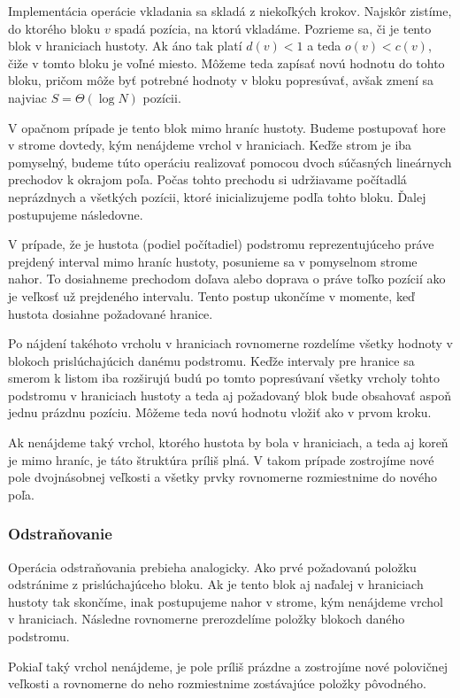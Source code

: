 Implementácia operácie vkladania sa skladá z niekoľkých krokov. Najskôr zistíme, do ktorého bloku $v$ spadá pozícia, na ktorú vkladáme. Pozrieme sa, či je tento blok v hraniciach hustoty. Ak áno tak platí $d(v) < 1$ a teda $o(v) < c(v)$, čiže v tomto bloku je voľné miesto. Môžeme teda zapísať novú hodnotu do tohto bloku, pričom môže byť potrebné hodnoty v bloku popresúvať, avšak zmení sa najviac $S = \Theta(\log{N})$ pozícii.

V opačnom prípade je tento blok mimo hraníc hustoty. Budeme postupovať hore v strome dovtedy, kým nenájdeme vrchol v hraniciach. Keďže strom je iba pomyselný, budeme túto operáciu realizovať pomocou dvoch súčasných lineárnych prechodov k okrajom poľa. Počas tohto prechodu si udržiavame počítadlá neprázdnych a všetkých pozícii, ktoré inicializujeme podľa tohto bloku. Ďalej postupujeme následovne.

V prípade, že je hustota (podiel počítadiel) podstromu reprezentujúceho práve prejdený interval  mimo hraníc hustoty, posunieme sa v pomyselnom strome nahor. To dosiahneme prechodom doľava alebo doprava o práve toľko pozícií ako je veľkosť už prejdeného intervalu. Tento postup ukončíme v momente, keď hustota dosiahne požadované hranice.

Po nájdení takéhoto vrcholu v hraniciach rovnomerne rozdelíme všetky hodnoty v blokoch prislúchajúcich danému podstromu. Keďže intervaly pre hranice sa smerom k listom iba rozširujú budú po tomto popresúvaní všetky vrcholy tohto podstromu v hraniciach hustoty a teda aj požadovaný blok bude obsahovať aspoň jednu prázdnu pozíciu. Môžeme teda novú hodnotu vložiť ako v prvom kroku.

Ak nenájdeme taký vrchol, ktorého hustota by bola v hraniciach, a teda aj koreň je mimo hraníc, je táto štruktúra príliš plná. V takom prípade zostrojíme nové pole dvojnásobnej veľkosti a všetky prvky rovnomerne rozmiestnime do nového poľa.

\subsubsection{Odstraňovanie}

Operácia odstraňovania prebieha analogicky. Ako prvé požadovanú položku odstránime z prislúchajúceho bloku. Ak je tento blok aj naďalej v hraniciach hustoty tak skončíme, inak postupujeme nahor v strome, kým nenájdeme vrchol v hraniciach. Následne rovnomerne prerozdelíme položky blokoch daného podstromu.

Pokiaľ taký vrchol nenájdeme, je pole príliš prázdne a zostrojíme nové polovičnej veľkosti a rovnomerne do neho rozmiestnime zostávajúce položky pôvodného.

